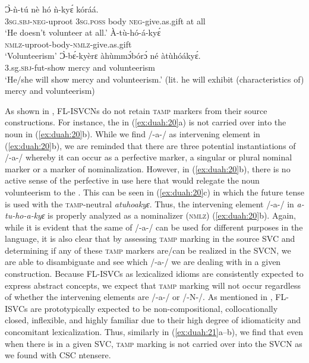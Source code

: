 \documentclass[output=paper,modfonts,nonflat,
colorlinks, citecolor=brown,
]{langsci/langscibook}
\begin{document}
\ea\label{ex:duah:20}
\ea\label{ex:duah:20a}
\gll Ɔ̀-ǹ-tú nè hó ǹ-kyɛ́ kóráá.\\
3\textsc{sg}.\textsc{sbj}-\textsc{neg}-uproot 3\textsc{sg}.\textsc{poss} body \textsc{neg}-give.as.gift {at all}\\
\glt `He doesn’t volunteer at all.'
\ex\label{ex:duah:20b}
\gll À-tù-hó-á-kyɛ́\\
\textsc{nmlz}-uproot-body-\textsc{nmlz}-give.as.gift\\
\glt `Volunteerism'
\ex\label{ex:duah:20c}
\gll Ɔ̀-bɛ́-kyèrɛ àhùmmɔ́bórɔ́ né àtùhóákyɛ́.\\
3.sg.\textsc{sbj}-fut-show mercy and 	volunteerism\\
\glt `He/she will show mercy and volunteerism.' (lit. he will exhibit (characteristics of) mercy and volunteerism)
\z
\z

\newpage
As shown in , FL-ISVCNs do not   retain \textsc{tamp} markers from their source constructions. For instance, the  in (\ref{ex:duah:20}a) is not carried over into the noun in (\ref{ex:duah:20}b). While we find /-a-/ as intervening element in (\ref{ex:duah:20}b), we are reminded that there are three potential instantiations of /-a-/ whereby it can occur as a perfective marker, a singular or plural nominal marker or a marker of nominalization. However, in (\ref{ex:duah:20}b), there is no active sense of the perfective in use here that would relegate the noun volunteerism to the . This can be seen in (\ref{ex:duah:20}c) in which the future tense is used with the \textsc{tamp}-neutral \textit{atuhoakyɛ}. Thus, the intervening element /-a-/ in \textit{a-tu-ho-a-kyɛ} is properly analyzed as a nominalizer (\textsc{nmlz}) (\ref{ex:duah:20}b). Again, while it is evident that the same  of /-a-/ can be used for different purposes in the language, it is also clear that by assessing \textsc{tamp} marking in the source SVC and determining if any of these \textsc{tamp} markers are/can be realized in the SVCN, we are able to disambiguate and see which /-a-/ we are dealing with in a given construction. Because FL-ISVCs as lexicalized idioms are consistently expected to express abstract concepts, we expect that \textsc{tamp} marking will not occur regardless of whether the intervening elements are /-a-/ or /-N-/. As mentioned in , FL-ISVCs are prototypically expected to be non-compositional, collocationally closed, inflexible, and highly familiar due to their high degree of idiomaticity and concomitant lexicalization. Thus, similarly in (\ref{ex:duah:21}a--b), we find that even when there is  in a given SVC, \textsc{tamp} marking is not carried over into the SVCN as we found with CSC ntensere.
\end{document}
